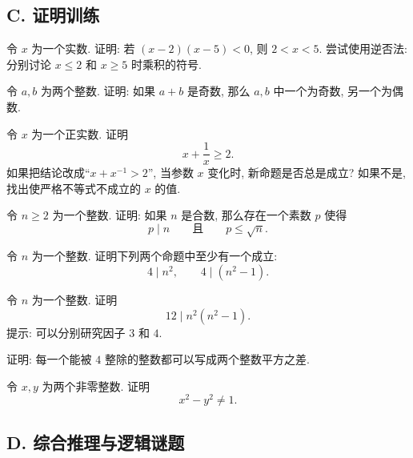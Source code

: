 \documentclass[usesamecnt, thmcnt=section, lang=cn, newtx, 10pt, scheme=chinese]{elegantbook}
\begin{document}
\subsection*{C. 证明训练}


\begin{exercise}
\label{ex:logic-23}
令 $x$ 为一个实数. 证明: 若 $(x-2)(x-5)<0$, 则 $2<x<5$. 尝试使用逆否法: 分别讨论 $x\leq2$ 和 $x\geq5$ 时乘积的符号.
\end{exercise}

\begin{exercise}
\label{ex:logic-24}
令 $a,b$ 为两个整数. 证明: 如果 $a+b$ 是奇数, 那么 $a,b$ 中一个为奇数, 另一个为偶数.

\end{exercise}

\begin{exercise}
\label{ex:logic-25}
令 $x$ 为一个正实数. 证明
\[
 x+\frac1x\geq2.
\]
如果把结论改成``$x+x^{-1}>2$'', 当参数 $x$ 变化时, 新命题是否总是成立? 如果不是, 找出使严格不等式不成立的 $x$ 的值.
\end{exercise}

\begin{exercise}
\label{ex:basic-logic-11}
令 $n\geq2$ 为一个整数. 证明: 如果 $n$ 是合数, 那么存在一个素数 $p$ 使得
\[
 p\mid n
 \qquad\text{且}\qquad
 p\leq\sqrt n.
\]
\end{exercise}

\begin{exercise}
\label{ex:basic-logic-12}
令 $n$ 为一个整数. 证明下列两个命题中至少有一个成立:
\[
 4\mid n^2,
 \qquad
 4\mid(n^2-1).
\]
\end{exercise}

\begin{exercise}
\label{ex:basic-logic-13}
令 $n$ 为一个整数. 证明
\[
 12\mid n^2(n^2-1).
\]
提示: 可以分别研究因子 $3$ 和 $4$.
\end{exercise}

\begin{exercise}
\label{ex:basic-logic-14}
证明: 每一个能被 $4$ 整除的整数都可以写成两个整数平方之差.
\end{exercise}

\begin{exercise}
\label{ex:basic-logic-15}
令 $x,y$ 为两个非零整数. 证明
\[
 x^2-y^2\neq1.
\]
\end{exercise}

\subsection*{D. 综合推理与逻辑谜题}
\end{document}
